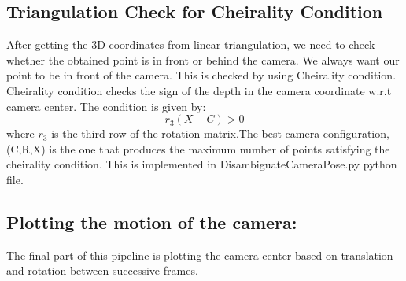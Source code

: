 \documentclass[12pt]{article}
\begin{document}
\subsection{Triangulation Check for Cheirality Condition}
After getting the 3D coordinates from linear triangulation, we need to check whether the obtained point is in front or behind the camera. We always want our point to be in front of the camera. This is checked by using Cheirality condition. Cheirality condition checks the sign of the depth in the camera coordinate w.r.t camera center. The condition is given by:
\begin{equation}
r_3(X - C) > 0
\end{equation}
where $r_3$ is the third row of the rotation matrix.The best camera configuration, (C,R,X) is the one that produces the maximum number of points satisfying the cheirality condition. This is implemented in DisambiguateCameraPose.py python file.

\subsection{Plotting the motion of the camera:}
The final part of this pipeline is plotting the camera center based on translation and rotation between successive frames.
\end{document}
